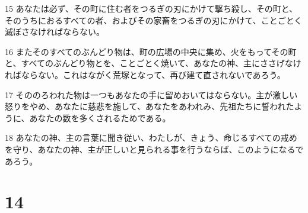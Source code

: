 \par 15 あなたは必ず、その町に住む者をつるぎの刃にかけて撃ち殺し、その町と、そのうちにおるすべての者、およびその家畜をつるぎの刃にかけて、ことごとく滅ぼさなければならない。
\par 16 またそのすべてのぶんどり物は、町の広場の中央に集め、火をもってその町と、すべてのぶんどり物とを、ことごとく焼いて、あなたの神、主にささげなければならない。これはながく荒塚となって、再び建て直されないであろう。
\par 17 そののろわれた物は一つもあなたの手に留めおいてはならない。主が激しい怒りをやめ、あなたに慈悲を施して、あなたをあわれみ、先祖たちに誓われたように、あなたの数を多くされるためである。
\par 18 あなたの神、主の言葉に聞き従い、わたしが、きょう、命じるすべての戒めを守り、あなたの神、主が正しいと見られる事を行うならば、このようになるであろう。

\chapter{14}

